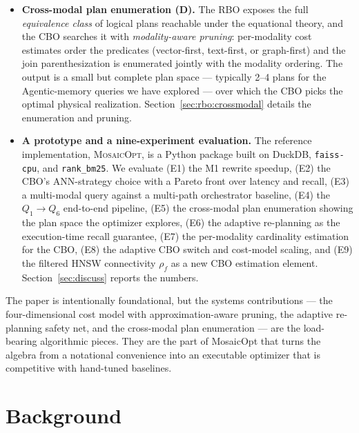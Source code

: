\documentclass[sigconf,nonacm,review]{acmart}
\theoremstyle{plain}
\theoremstyle{definition}
\theoremstyle{remark}
\begin{document}
\begin{itemize}[leftmargin=*]
    re-planning closes the gap between estimated and observed
    recall). Section~\ref{sec:cbo} details the algorithm; the
    safety argument is in Section~\ref{sec:cbo:adaptive}.
  \item \textbf{Cross-modal plan enumeration (D).} The RBO exposes
    the full \emph{equivalence class} of logical plans reachable
    under the equational theory, and the CBO searches it with
    \emph{modality-aware pruning}: per-modality cost estimates
    order the predicates (vector-first, text-first, or graph-first)
    and the join parenthesization is enumerated jointly with the
    modality ordering. The output is a small but complete plan
    space --- typically 2--4 plans for the Agentic-memory queries
    we have explored --- over which the CBO picks the optimal
    physical realization. Section~\ref{sec:rbo:crossmodal} details
    the enumeration and pruning.
  \item \textbf{A prototype and a nine-experiment evaluation.} The
    reference implementation, \textsc{MosaicOpt}, is a Python
    package built on DuckDB, \texttt{faiss-cpu}, and
    \texttt{rank\_bm25}. We evaluate (E1) the M1 rewrite speedup,
    (E2) the CBO's ANN-strategy choice with a Pareto front over
    latency and recall, (E3) a multi-modal query against a
    multi-path orchestrator baseline, (E4) the $Q_1 \to Q_6$
    end-to-end pipeline, (E5) the cross-modal plan enumeration
    showing the plan space the optimizer explores, (E6) the
    adaptive re-planning as the execution-time recall guarantee,
    (E7) the per-modality cardinality estimation for the CBO,
    (E8) the adaptive CBO switch and cost-model scaling, and
    (E9) the filtered HNSW connectivity $\rho_f$ as a new CBO
    estimation element. Section~\ref{sec:discuss} reports the
    numbers.
\end{itemize}

The paper is intentionally foundational, but the systems
contributions --- the four-dimensional cost model with
approximation-aware pruning, the adaptive re-planning safety net,
and the cross-modal plan enumeration --- are the load-bearing
algorithmic pieces. They are the part of MosaicOpt that turns the
algebra from a notational convenience into an executable optimizer
that is competitive with hand-tuned baselines.

\section{Background}\label{sec:background}
\end{document}
